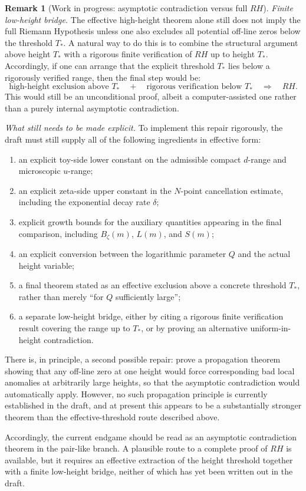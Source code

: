 \documentclass[11pt,a4paper]{amsart}
\def\RH{RH}%
\theoremstyle{plain}
\theoremstyle{definition}
\newtheorem{remark}[theorem]{Remark}
\newcommand{\RH}{\mathrm{RH}}
\begin{document}
\begin{remark}[Work in progress: asymptotic contradiction versus full $\RH$]
\smallskip

\noindent
\emph{Finite low-height bridge.}
The effective high-height theorem alone still does not imply the full Riemann
Hypothesis unless one also excludes all potential off-line zeros below the
threshold $T_*$.  A natural way to do this is to combine the structural
argument above height $T_*$ with a rigorous finite verification of $\RH$
up to height $T_*$.  Accordingly, if one can arrange that the explicit
threshold $T_*$ lies below a rigorously verified range, then the final step
would be:
\[
\text{high-height exclusion above }T_*
\quad+\quad
\text{rigorous verification below }T_*
\quad\Longrightarrow\quad
\RH.
\]
This would still be an unconditional proof, albeit a computer-assisted one
rather than a purely internal asymptotic contradiction.

\smallskip

\noindent
\emph{What still needs to be made explicit.}
To implement this repair rigorously, the draft must still supply all of the
following ingredients in effective form:
\begin{enumerate}
\item an explicit toy-side lower constant on the admissible compact
$d$-range and microscopic $u$-range;
\item an explicit zeta-side upper constant in the $N$-point cancellation
estimate, including the exponential decay rate $\delta$;
\item explicit growth bounds for the auxiliary quantities appearing in the
final comparison, including $B_\zeta(m)$, $L(m)$, and $S(m)$;
\item an explicit conversion between the logarithmic parameter $Q$ and the
actual height variable;
\item a final theorem stated as an effective exclusion above a concrete
threshold $T_*$, rather than merely ``for $Q$ sufficiently large'';
\item a separate low-height bridge, either by citing a rigorous finite
verification result covering the range up to $T_*$, or by proving an
alternative uniform-in-height contradiction.
\end{enumerate}

\smallskip

\noindent
There is, in principle, a second possible repair: prove a propagation theorem
showing that any off-line zero at one height would force corresponding bad
local anomalies at arbitrarily large heights, so that the asymptotic
contradiction would automatically apply.  However, no such propagation
principle is currently established in the draft, and at present this appears
to be a substantially stronger theorem than the effective-threshold route
described above.

Accordingly, the current endgame should be read as an asymptotic contradiction
theorem in the pair-like branch.  A plausible route to a complete proof of
$\RH$ is available, but it requires an effective extraction of the height
threshold together with a finite low-height bridge, neither of which has yet
been written out in the draft.
\end{remark}
\end{document}

